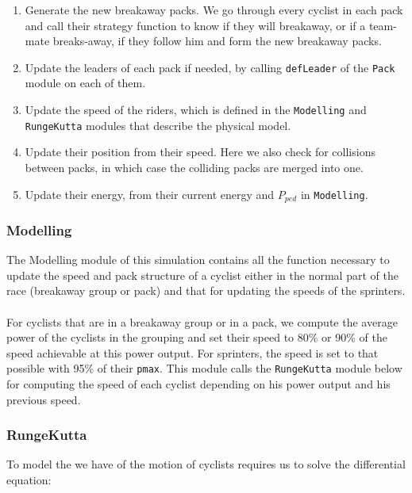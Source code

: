 \documentclass[10pt, a4paper]{report}
\begin{document}
\begin{enumerate}
\item Generate the new breakaway packs. We go through every cyclist in each pack and call their strategy function to know if they will breakaway, or if a team-mate breaks-away, if they follow him and form the new breakaway packs.
\item Update the leaders of each pack if needed, by calling \texttt{defLeader} of the \texttt{Pack} module on each of them.
\item Update the speed of the riders, which is defined in the \texttt{Modelling} and \texttt{RungeKutta} modules that describe the physical model.
\item Update their position from their speed. Here we also check for collisions between packs, in which case the colliding packs are merged into one.
\item Update their energy, from their current energy and $P_{ped}$ in \texttt{Modelling}.
\end{enumerate}

\subsubsection{Modelling}

The Modelling module of this simulation contains all the function necessary to update the speed and pack structure of a cyclist either in the normal part of the race (breakaway group or pack) and that for updating the speeds of the sprinters. \\\\
For cyclists that are in a breakaway group or in a pack, we compute the average power of the cyclists in the grouping and set their speed to 80\% or 90\% of the speed achievable at this power output. For sprinters, the speed is set to that possible with 95\% of their \texttt{pmax}. This module calls the \texttt{RungeKutta} module below for computing the speed of each cyclist depending on his power output and his previous speed.

\subsubsection{RungeKutta}

To model the we have of the motion of cyclists requires us to solve the differential equation:
\end{document}
